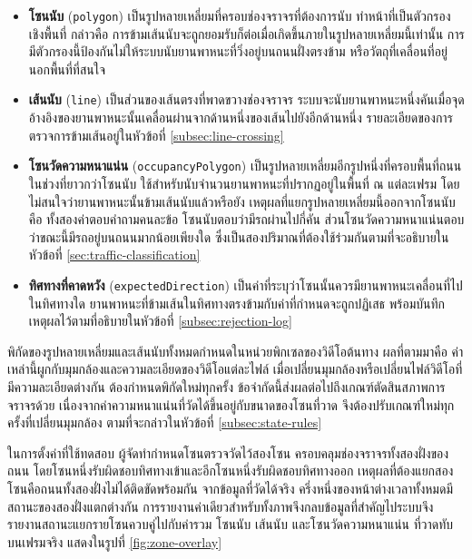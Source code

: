 \begin{itemize}
    \item \textbf{โซนนับ} (\texttt{polygon}) เป็นรูปหลายเหลี่ยมที่ครอบช่องจราจรที่ต้องการนับ ทำหน้าที่เป็นตัวกรองเชิงพื้นที่ กล่าวคือ การข้ามเส้นนับจะถูกยอมรับก็ต่อเมื่อเกิดขึ้นภายในรูปหลายเหลี่ยมนี้เท่านั้น  การมีตัวกรองนี้ป้องกันไม่ให้ระบบนับยานพาหนะที่วิ่งอยู่บนถนนฝั่งตรงข้าม หรือวัตถุที่เคลื่อนที่อยู่นอกพื้นที่ที่สนใจ
    \item \textbf{เส้นนับ} (\texttt{line}) เป็นส่วนของเส้นตรงที่พาดขวางช่องจราจร ระบบจะนับยานพาหนะหนึ่งคันเมื่อจุดอ้างอิงของยานพาหนะนั้นเคลื่อนผ่านจากด้านหนึ่งของเส้นไปยังอีกด้านหนึ่ง รายละเอียดของการตรวจการข้ามเส้นอยู่ในหัวข้อที่ \ref{subsec:line-crossing}
    \item \textbf{โซนวัดความหนาแน่น} (\texttt{occupancyPolygon}) เป็นรูปหลายเหลี่ยมอีกรูปหนึ่งที่ครอบพื้นที่ถนนในช่วงที่ยาวกว่าโซนนับ ใช้สำหรับนับจำนวนยานพาหนะที่ปรากฏอยู่ในพื้นที่ ณ แต่ละเฟรม โดยไม่สนใจว่ายานพาหนะนั้นข้ามเส้นนับแล้วหรือยัง  เหตุผลที่แยกรูปหลายเหลี่ยมนี้ออกจากโซนนับคือ ทั้งสองค่าตอบคำถามคนละข้อ โซนนับตอบว่ามีรถผ่านไปกี่คัน ส่วนโซนวัดความหนาแน่นตอบว่าขณะนี้มีรถอยู่บนถนนมากน้อยเพียงใด ซึ่งเป็นสองปริมาณที่ต้องใช้ร่วมกันตามที่จะอธิบายในหัวข้อที่ \ref{sec:traffic-classification}
    \item \textbf{ทิศทางที่คาดหวัง} (\texttt{expectedDirection}) เป็นค่าที่ระบุว่าโซนนั้นควรมียานพาหนะเคลื่อนที่ไปในทิศทางใด ยานพาหนะที่ข้ามเส้นในทิศทางตรงข้ามกับค่าที่กำหนดจะถูกปฏิเสธ พร้อมบันทึกเหตุผลไว้ตามที่อธิบายในหัวข้อที่ \ref{subsec:rejection-log}
\end{itemize}

พิกัดของรูปหลายเหลี่ยมและเส้นนับทั้งหมดกำหนดในหน่วยพิกเซลของวิดีโอต้นทาง ผลที่ตามมาคือ ค่าเหล่านี้ผูกกับมุมกล้องและความละเอียดของวิดีโอแต่ละไฟล์ เมื่อเปลี่ยนมุมกล้องหรือเปลี่ยนไฟล์วิดีโอที่มีความละเอียดต่างกัน ต้องกำหนดพิกัดใหม่ทุกครั้ง  ข้อจำกัดนี้ส่งผลต่อไปถึงเกณฑ์ตัดสินสภาพการจราจรด้วย เนื่องจากค่าความหนาแน่นที่วัดได้ขึ้นอยู่กับขนาดของโซนที่วาด จึงต้องปรับเกณฑ์ใหม่ทุกครั้งที่เปลี่ยนมุมกล้อง ตามที่จะกล่าวในหัวข้อที่ \ref{subsec:state-rules}

ในการตั้งค่าที่ใช้ทดสอบ ผู้จัดทำกำหนดโซนตรวจวัดไว้สองโซน ครอบคลุมช่องจราจรทั้งสองฝั่งของถนน โดยโซนหนึ่งรับผิดชอบทิศทางเข้าและอีกโซนหนึ่งรับผิดชอบทิศทางออก เหตุผลที่ต้องแยกสองโซนคือถนนทั้งสองฝั่งไม่ได้ติดขัดพร้อมกัน จากข้อมูลที่วัดได้จริง ครึ่งหนึ่งของหน้าต่างเวลาทั้งหมดมีสถานะของสองฝั่งแตกต่างกัน การรายงานค่าเดียวสำหรับทั้งภาพจึงกลบข้อมูลที่สำคัญไประบบจึงรายงานสถานะแยกรายโซนควบคู่ไปกับค่ารวม โซนนับ เส้นนับ และโซนวัดความหนาแน่น
ที่วาดทับบนเฟรมจริง แสดงในรูปที่ \ref{fig:zone-overlay}

